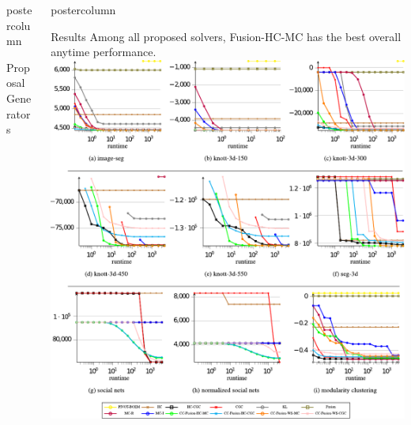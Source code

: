 \documentclass[final,hyperref={pdfpagelabels=false}]{beamer}
\newlength{\columnheight}
\begin{document}
\begin{frame}
\begin{columns}
\begin{column}{.49\textwidth}
\begin{beamercolorbox}[center,wd=\textwidth]{postercolumn}
\begin{minipage}[T]{.95\textwidth}
{\begin{block}{Proposal Generators}
            \end{block}

          }
        \end{minipage}
      \end{beamercolorbox}
    \end{column}

    \begin{column}{.49\textwidth}
      \begin{beamercolorbox}[center,wd=\textwidth]{postercolumn}
        \begin{minipage}[T]{.95\textwidth} %
          \parbox[t][\columnheight]{\textwidth}{ %
            
            \begin{block}{Results}
            Among all proposed solvers, Fusion-HC-MC has the best overall anytime performance.
            \includegraphics[width=0.9\linewidth]{res_images.pdf}



\end{block}}
\end{minipage}
\end{beamercolorbox}
\end{column}
\end{columns}
\end{frame}
\end{document}
